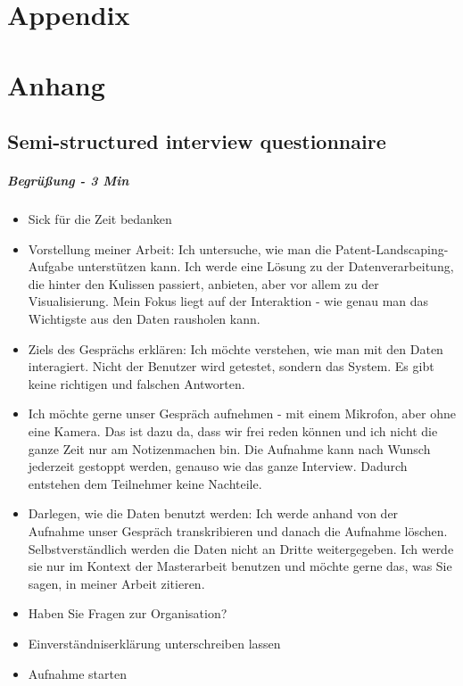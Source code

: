 
{\chapter{Appendix}}    %
{\chapter{Anhang}}      %
\label{chap:appendix}

\section{Semi-structured interview questionnaire}
\label{sec:semi_structured_interview_questionnaire}

\paragraph{Begrüßung - 3 Min}

\begin{itemize}
\item Sick für die Zeit bedanken
\item Vorstellung meiner Arbeit: 
Ich untersuche, wie man die Patent-Landscaping-Aufgabe unterstützen kann. 
Ich werde eine Lösung zu der Datenverarbeitung, die hinter den Kulissen passiert, anbieten, aber vor allem zu der Visualisierung. 
Mein Fokus liegt auf der Interaktion - wie genau man das Wichtigste aus den Daten rausholen kann.
\item Ziels des Gesprächs erklären: Ich möchte verstehen, wie man mit den Daten interagiert. 
Nicht der Benutzer wird getestet, sondern das System. 
Es gibt keine richtigen und falschen Antworten.
\item Ich möchte gerne unser Gespräch aufnehmen -  mit einem Mikrofon, aber ohne eine Kamera. 
Das ist dazu da, dass wir frei reden können und ich nicht die ganze Zeit nur am Notizenmachen bin. 
Die Aufnahme kann nach Wunsch jederzeit gestoppt werden, genauso wie das ganze Interview. 
Dadurch entstehen dem Teilnehmer keine Nachteile. 
\item Darlegen, wie die Daten benutzt werden: Ich werde anhand von der Aufnahme unser Gespräch transkribieren und danach die Aufnahme löschen. 
Selbstverständlich werden die Daten nicht an Dritte weitergegeben. 
Ich werde sie nur im Kontext der Masterarbeit benutzen und möchte gerne das, was Sie sagen, in meiner Arbeit zitieren.
\item Haben Sie Fragen zur Organisation?
\item Einverständniserklärung unterschreiben lassen
\item Aufnahme starten
\end{itemize}

